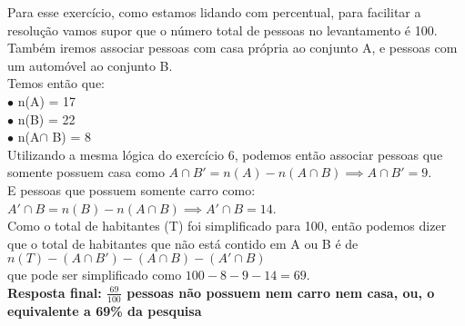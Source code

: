 \begin{solution}{}{}
    Para esse exercício, como estamos lidando com percentual, para facilitar a resolução vamos supor que o número total de pessoas no levantamento é 100.\\
    Também iremos associar pessoas com casa própria ao conjunto A, e pessoas com um automóvel ao conjunto B. \\
    Temos então que: \\
    $\bullet$ n(A) = 17 \\
    $\bullet$ n(B) = 22 \\
    $\bullet$ n(A$\cap$ B) = 8 \\

    Utilizando a mesma lógica do exercício 6, podemos então associar pessoas que somente possuem casa como $A\cap B' = n(A) - n(A\cap B) \implies A\cap B' = 9$. \\
    E pessoas que possuem somente carro como: $A'\cap B = n(B) - n(A\cap B) \implies A'\cap B = 14$. \\
    Como o total de habitantes (T) foi simplificado para 100, então podemos dizer que o total de habitantes que não está contido em A ou B é de $n(T) - (A\cap B') - (A\cap B) - (A'\cap B)$ \\
    que pode ser simplificado como $100-8-9-14=69$. \\
    \textbf{Resposta final: $\frac{69}{100}$ pessoas não possuem nem carro nem casa, ou, o equivalente a 69\% da pesquisa}
\end{solution}

